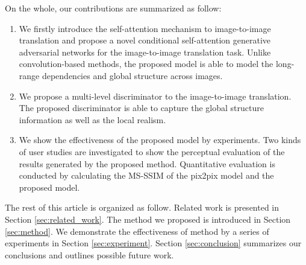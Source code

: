 On the whole, our contributions are summarized as follow:
%
\begin{enumerate}
	\item We firstly introduce the self-attention mechanism to image-to-image translation and propose a novel conditional self-attention generative adversarial networks for the image-to-image translation task. Unlike convolution-based methods, the proposed model is able to model the long-range dependencies and global structure across images.
	\item We propose a multi-level discriminator to the image-to-image translation. The proposed discriminator is able to capture the global structure information as well as the local realism. 
	\item We show the effectiveness of the proposed model by experiments. Two kinds of user studies are investigated to show the perceptual evaluation of the results generated by the proposed method. Quantitative evaluation is conducted by calculating the MS-SSIM of the pix2pix model and the proposed model.
	
\end{enumerate}

 

The rest of this article is organized as follow. Related work is presented in Section \ref{sec:related_work}. The method we proposed is introduced in Section \ref{sec:method}. We demonstrate the effectiveness of method by a series of experiments in Section \ref{sec:experiment}. Section \ref{sec:conclusion} summarizes our conclusions and outlines 
possible future work.